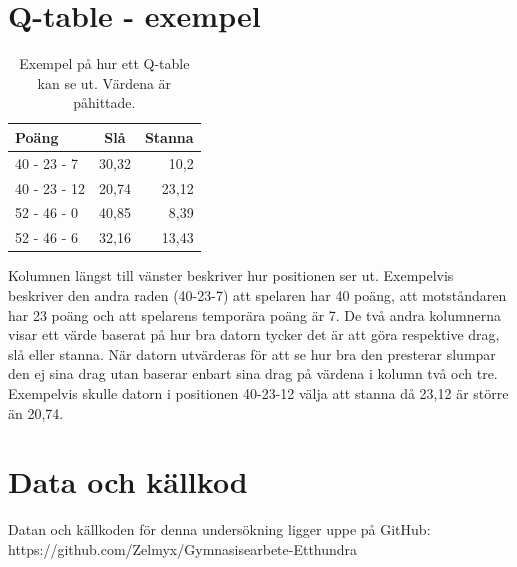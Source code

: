 \documentclass[12pt,a4paper]{article}
\begin{document}
    \section{Q-table - exempel}\label{tab:qtable}
      \begin{table}[H]
        \centering
        \caption{Exempel på hur ett Q-table kan se ut. Värdena är påhittade.}
        \begin{tabular}{l c r}
          \textbf{Poäng} & \textbf{Slå} & \textbf{Stanna} \\ \hline
          40 - 23 - 7    & 30,32        & 10,2            \\
          40 - 23 - 12   & 20,74        & 23,12           \\
          52 - 46 - 0    & 40,85        & 8,39            \\
          52 - 46 - 6    & 32,16        & 13,43           \\
        \end{tabular}
      \end{table}
      Kolumnen längst till vänster beskriver hur positionen ser ut. Exempelvis beskriver den andra raden (40-23-7) att spelaren har 40 poäng, att motståndaren har 23 poäng och att spelarens temporära poäng är 7. De två andra kolumnerna visar ett värde baserat på hur bra datorn tycker det är att göra respektive drag, slå eller stanna. När datorn utvärderas för att se hur bra den presterar slumpar den ej sina drag utan baserar enbart sina drag på värdena i kolumn två och tre. Exempelvis skulle datorn i positionen 40-23-12 välja att stanna då 23,12 är större än 20,74.
    \section{Data och källkod}\label{app:data}
      Datan och källkoden för denna undersökning ligger uppe på GitHub: \\

      https://github.com/Zelmyx/Gymnasisearbete-Etthundra
\end{document}
